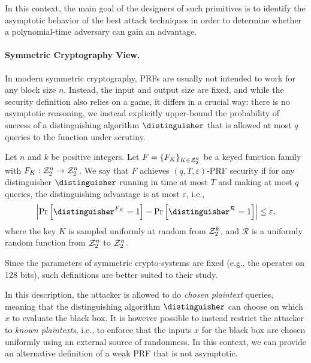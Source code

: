 In this context, the main goal of the designers of such primitives is to identify the asymptotic behavior of the best attack techniques in order to determine whether a polynomial-time adversary can gain an advantage.


\paragraph{Symmetric Cryptography View.}

In modern symmetric cryptography, PRFs are usually not intended to work for any block size $n$. Instead, the input and output size are fixed, and while the security definition also relies on a game, it differs in a crucial way: there is no asymptotic reasoning, we instead explicitly upper-bound the probability of success of a distinguishing algorithm $\distinguisher$ that is allowed at most $q$ queries to the function under scrutiny.

\begin{definition}
Let $n$ and $k$ be positive integers. Let $F = \{F_K\}_{K \in \mathcal{Z}_2^k}$ be a keyed function family with $F_K : \mathcal{Z}_2^n \to \mathcal{Z}_2^n$. We say that $F$ 
 achieves $(q,T,\varepsilon)$-PRF security if for any distinguisher $\distinguisher$ running in time at most $T$ and making at most $q$ queries, the distinguishing advantage is at most $\varepsilon$, i.e.,
\[
\left| \Pr\left[\distinguisher^{F_K} = 1 \right] - \Pr\left[\distinguisher^{\mathcal{R}} = 1 \right] \right| \leq \varepsilon,
\]
where the key $K$ is sampled uniformly at random from $\mathcal{Z}_2^k$, and $\mathcal{R}$ is a uniformly random function from $\mathcal{Z}_2^n$ to $\mathcal{Z}_2^n$.
\end{definition}


Since the parameters of symmetric crypto-systems are fixed (e.g., the \aes{} operates on 128 bits), such definitions are better suited to their study.

In this description, the attacker is allowed to do \emph{chosen plaintext} queries, meaning that the distinguishing algorithm $\distinguisher$ can choose on which $x$ to evaluate the black box. It is however possible to instead restrict the attacker to \emph{known plaintexts}, i.e., to enforce that the inputs $x$ for the black box are chosen uniformly using an external source of randomness. In this context, we can provide an alternative definition of a weak PRF that is not asymptotic.



